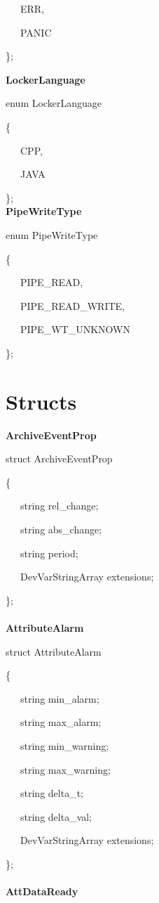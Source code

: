 ~~~ERR,

~~~PANIC

\};\\


\begin{flushleft}
\textbf{LockerLanguage}
\par\end{flushleft}

enum LockerLanguage

\{

~~~CPP,

~~~JAVA

\};\\


\textbf{PipeWriteType}

enum PipeWriteType

\{

~~~PIPE\_READ,

~~~PIPE\_READ\_WRITE,

~~~PIPE\_WT\_UNKNOWN

\};


\section{Structs}

\textbf{ArchiveEventProp}

struct ArchiveEventProp

\{

~~~string rel\_change;

~~~string abs\_change;

~~~string period;

~~~DevVarStringArray extensions;

\};\textbf{}\\
\textbf{}\\
\textbf{AttributeAlarm}

struct AttributeAlarm

\{

~~~string min\_alarm;

~~~string max\_alarm;

~~~string min\_warning;

~~~string max\_warning;

~~~string delta\_t;

~~~string delta\_val;

~~~DevVarStringArray extensions;

\};\textbf{}\\
\textbf{}\\
\textbf{AttDataReady}

